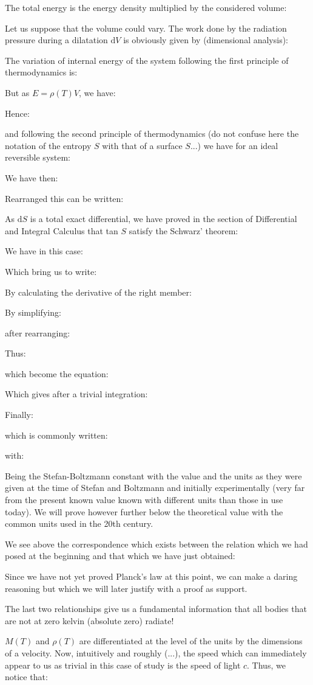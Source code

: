 \begin{dem}
	The total energy is the energy density multiplied by the considered volume:
	
	Let us suppose that the volume could vary. The work done by the radiation pressure during a dilatation $\mathrm{d}V$ is obviously given by (dimensional analysis):
	
	The variation of internal energy of the system following the first principle of thermodynamics is:
	
	But as $E=\rho(T)V$, we have:
	
	Hence:
	
	and following the second principle of thermodynamics (do not confuse here the notation of the entropy $S$ with that of a surface $S$...) we have for an ideal reversible system:
	
	We have then:
	
	Rearranged this can be written:
	
	As $\mathrm{d}S$ is a total exact differential, we have proved in the section of Differential and Integral Calculus that tan $S$ satisfy the Schwarz' theorem:
	
	We have in this case:
	
	Which bring us to write:
	
	By calculating the derivative of the right member:
	
	By simplifying:
	
	after rearranging:
	
	Thus:
	
	which become the equation:
	
	Which gives after a trivial integration:
	
	Finally:
	
	which is commonly written:
	
	with:
	
	Being the Stefan-Boltzmann constant with the value and the units as they were given at the time of Stefan and Boltzmann and initially experimentally (very far from the present known value known with different units than those in use today). We will prove however further below the theoretical value with the common units used in the 20th century.
	
	We see above the correspondence which exists between the relation which we had posed at the beginning and that which we have just obtained:
	
	Since we have not yet proved Planck's law at this point, we can make a daring reasoning but which we will later justify with a proof as support.
	\begin{tcolorbox}[title=Remark,colframe=black,arc=10pt]
	The last two relationships give us a fundamental information that all bodies that are not at zero kelvin (absolute zero) radiate!
	\end{tcolorbox}
	$M (T)$ and $\rho(T)$ are differentiated at the level of the units by the dimensions of a velocity. Now, intuitively and roughly (...), the speed which can immediately appear to us as trivial in this case of study is the speed of light $c$. Thus, we notice that:
	

\end{dem}
